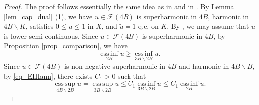 \documentclass[11pt,a4paper]{article}
\numberwithin{equation}{section}
\newcommand{\esup}{\operatorname*{ess\,sup}}
\newcommand{\einf}{\operatorname*{ess\,inf}}
\theoremstyle{plain}
\theoremstyle{definition}
\begin{document}
\begin{proof}
The proof follows essentially the same idea as in \cite[Lemma 11.20]{BB11} and in \cite[Lemma 6.21]{HKM06}. By Lemma \ref{lem_cap_dual} (1), we have $u\in \mathcal{F}(4B)$ is superharmonic in $4B$, harmonic in $4B\backslash K$, satisfies $0\le u\le 1$ in $X$, and $\widetilde{u}=1$ q.e. on $K$. By \hyperlink{eq_LSC}{}, we may assume that $u$ is lower semi-continuous. Since $u\in \mathcal{F}(4B)$ is superharmonic in $4B$, by Proposition \ref{prop_comparison}, we have
$$\einf_{2B}u\ge\einf_{3B\backslash {2B}}u.$$
Since $u\in \mathcal{F}(4B)$ is non-negative superharmonic in $4B$ and harmonic in $4B\backslash \overline{B}$, by \ref{eq_EHIann}, there exists $C_1>0$ such that
\begin{equation}\label{eq_RBA1}
\esup_{4B\backslash {2B}}u=\esup_{3B\backslash {2B}}u\le C_1\einf_{3B\backslash {2B}}u\le C_1\einf_{2B}u.
\end{equation}


\end{proof}
\end{document}
